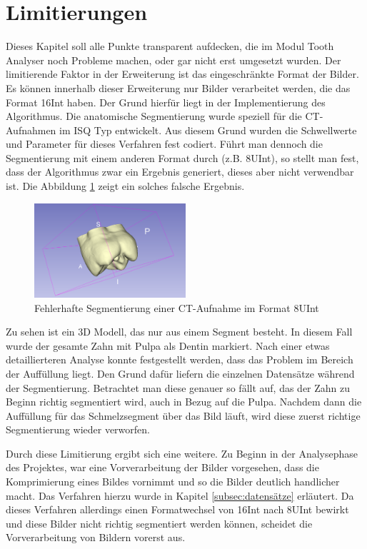 \section{Limitierungen}
\label{sec:limitierungen} Dieses Kapitel soll alle Punkte transparent aufdecken,
die im Modul Tooth Analyser noch Probleme machen, oder gar nicht erst umgesetzt wurden.
Der limitierende Faktor in der Erweiterung ist das eingeschränkte Format der
Bilder. Es können innerhalb dieser Erweiterung nur Bilder verarbeitet werden,
die das Format \ac{16Int} haben. Der Grund hierfür liegt in der Implementierung
des Algorithmus. Die anatomische Segmentierung wurde speziell für die \ac{CT}-Aufnahmen
im \ac{ISQ} Typ entwickelt. Aus diesem Grund wurden die Schwellwerte und
Parameter für dieses Verfahren fest codiert. Führt man dennoch die Segmentierung
mit einem anderen Format durch (z.B. \ac{8UInt}), so stellt man fest, dass der Algorithmus
zwar ein Ergebnis generiert, dieses aber nicht verwendbar ist. Die Abbildung \ref{fig:3d_error}
zeigt ein solches falsche Ergebnis.

\begin{figure}[h]
	\centering
	\includegraphics[width=0.5\textwidth]{img/3d_view_error.png}
	\caption{Fehlerhafte Segmentierung einer CT-Aufnahme im Format 8UInt}
	\label{fig:3d_error}
\end{figure}

Zu sehen ist ein 3D Modell, das nur aus einem Segment besteht. In diesem Fall
wurde der gesamte Zahn mit Pulpa als Dentin markiert. Nach einer etwas detaillierteren
Analyse konnte festgestellt werden, dass das Problem im Bereich der Auffüllung
liegt. Den Grund dafür liefern die einzelnen Datensätze während der Segmentierung.
Betrachtet man diese genauer so fällt auf, das der Zahn zu Beginn richtig segmentiert
wird, auch in Bezug auf die Pulpa. Nachdem dann die Auffüllung für das Schmelzsegment
über das Bild läuft, wird diese zuerst richtige Segmentierung wieder verworfen.

Durch diese Limitierung ergibt sich eine weitere. Zu Beginn in der Analysephase des
Projektes, war eine Vorverarbeitung der Bilder vorgesehen, dass die Komprimierung
eines Bildes vornimmt und so die Bilder deutlich handlicher macht. Das Verfahren
hierzu wurde in Kapitel \ref{subsec:datensätze} erläutert. Da dieses Verfahren allerdings
einen Formatwechsel von \ac{16Int} nach \ac{8UInt} bewirkt und diese Bilder nicht
richtig segmentiert werden können, scheidet die Vorverarbeitung von Bildern
vorerst aus.

